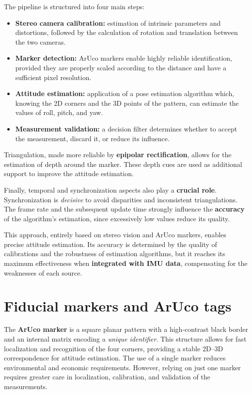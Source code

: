 The pipeline is structured into four main steps:
\begin{itemize}
    \item \textbf{Stereo camera calibration:} estimation of intrinsic parameters and distortions, 
    followed by the calculation of rotation and translation between the two cameras.
    \item \textbf{Marker detection:} ArUco markers enable highly reliable identification, 
    provided they are properly scaled according to the distance and have a sufficient pixel resolution.
    \item \textbf{Attitude estimation:} application of a pose estimation algorithm which, 
    knowing the 2D corners and the 3D points of the pattern, can estimate the values of roll, pitch, and yaw.
    \item \textbf{Measurement validation:} a decision filter determines whether to accept the measurement, 
    discard it, or reduce its influence.
\end{itemize}

Triangulation, made more reliable by \textbf{epipolar rectification}, allows for the estimation of depth around the marker. 
These depth cues are used as additional support to improve the attitude estimation.\

Finally, temporal and synchronization aspects also play a \textbf{crucial role}. 
Synchronization is \textit{decisive} to avoid disparities and inconsistent triangulations. 
The frame rate and the subsequent update time strongly influence the \textbf{accuracy} of the algorithm’s estimation, 
since excessively low values reduce its quality.

This approach, entirely based on stereo vision and ArUco markers, enables precise attitude estimation. 
Its accuracy is determined by the quality of calibrations and the robustness of estimation algorithms, 
but it reaches its maximum effectiveness when \textbf{integrated with IMU data}, 
compensating for the weaknesses of each source.

\section{Fiducial markers and ArUco tags}

The \textbf{ArUco marker} is a square planar pattern with a high-contrast black border and an internal matrix encoding a \textit{unique identifier}. This structure allows for fast localization and recognition of the four corners, providing a stable 2D--3D correspondence for attitude estimation. The use of a single marker reduces environmental and economic requirements. However, relying on just one marker requires greater care in localization, calibration, and validation of the measurements.

